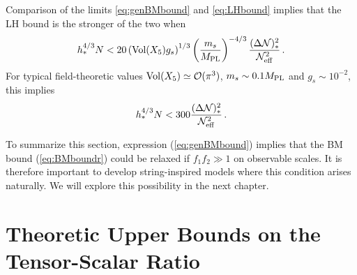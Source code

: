 Comparison of the limits \eqref{eq:genBMbound} and \eqref{eq:LHbound}
implies that the LH bound is the stronger of the two when
% 
\begin{equation}
\label{eq:LHstronger}
h_*^{4/3}N < 20 \left( \mathrm{Vol} (X_5) g_s \right)^{1/3}  
\left( \frac{m_s}{M_{\mathrm{PL}}} \right)^{-4/3} 
\frac{( \Delta \mathcal{N} )_*^2}{\mathcal{N}_\mathrm{eff}^2} \,.
\end{equation}
% 
For typical field-theoretic values $\mathrm{Vol} (X_5) \simeq \mathcal{O}(\pi^3)$, $m_s \sim
0.1 M_{\mathrm{PL}}$ 
and  $g_s \sim 10^{-2}$, this implies
%  
\begin{equation}
\label{eq:LHstronger1}
h_*^{4/3} N < 300 \frac{(\Delta \mathcal{N})^2_*}{\mathcal{N}_\mathrm{eff}^2} \,.
\end{equation}
% 

To summarize this section, 
expression (\ref{eq:genBMbound}) implies that the 
BM bound (\ref{eq:BMboundr}) 
could be relaxed if $f_1f_2 \gg 1$ on observable scales. 
It is therefore important to develop string-inspired models 
where this condition arises naturally. We will explore this possibility in the
next chapter.

\section{Theoretic Upper Bounds on the Tensor-Scalar Ratio}
\label{sec:theobound-multi}




